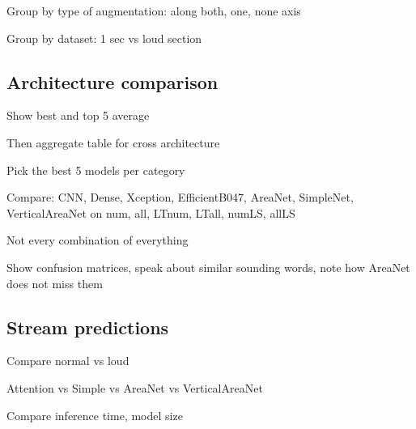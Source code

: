Group by type of augmentation: along both, one, none axis

Group by dataset: 1 sec vs loud section

\subsection{Architecture comparison}

Show best and top 5 average

Then aggregate table for cross architecture

Pick the best 5 models per category

Compare: CNN, Dense, Xception, EfficientB047, AreaNet, SimpleNet,
VerticalAreaNet on num, all, LTnum, LTall, numLS, allLS

Not every combination of everything

Show confusion matrices, speak about similar sounding words, note how AreaNet
does not miss them

\subsection{Stream predictions}

Compare normal vs loud

Attention vs Simple vs AreaNet vs VerticalAreaNet

Compare inference time, model size
